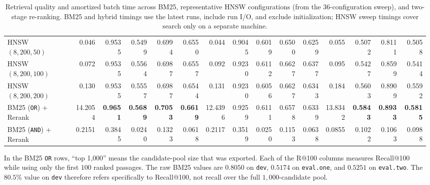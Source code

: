 \documentclass[11pt]{article}
\begin{document}
\begin{table}[H]
{\begin{tabular}{l|rrrrr|rrrrr|rrrr}
HNSW $(8, 200, 50)$  & 0.046 & 0.9535 & 0.5499 & 0.6994 & 0.6550 & 0.044 & 0.9045 & 0.6019 & 0.6500 & 0.6259 & 0.055 & 0.5072 & 0.8111 & 0.5058 \\
HNSW $(8, 200, 100)$ & 0.072 & 0.9535 & 0.5564 & 0.6987 & 0.6557 & 0.092 & 0.9230 & 0.6112 & 0.6627 & 0.6377 & 0.095 & 0.5427 & 0.8599 & 0.5414 \\
HNSW $(8, 200, 200)$ & 0.130 & 0.9535 & 0.5557 & 0.6987 & 0.6544 & 0.131 & 0.9230 & 0.6056 & 0.6627 & 0.6343 & 0.184 & 0.5603 & 0.8909 & 0.5592 \\
\midrule
BM25 (\texttt{OR}) + Rerank  & 14.2054 & \textbf{0.9651} & \textbf{0.5689} & \textbf{0.7053} & \textbf{0.6619} & 12.4396 & 0.9259 & 0.6111 & 0.6578 & 0.6339 & 13.8342 & \textbf{0.5843} & \textbf{0.8933} & \textbf{0.5815} \\
BM25 (\texttt{AND}) + Rerank & 0.2151 & 0.3845 & 0.0240 & 0.1323 & 0.0618 & 0.2117 & 0.3519 & 0.0250 & 0.1153 & 0.0638 & 0.0855 & 0.1022 & 0.1063 & 0.0988 \\
\bottomrule
\end{tabular}%
}
\caption{Retrieval quality and amortized batch time across BM25, representative HNSW configurations (from the 36-configuration sweep), and two-stage re-ranking. BM25 and hybrid timings use the latest runs, include run I/O, and exclude initialization; HNSW sweep timings cover search only on a separate machine.}
\label{tab:hnsw_sweep}
\end{table}

In the BM25 \texttt{OR} rows, ``top 1,000'' means the candidate-pool size that was exported. Each of the R@100 columns measures Recall@100 while using only the first $100$ ranked passages. The raw BM25 values are $0.8050$ on \texttt{dev}, $0.5174$ on \texttt{eval.one}, and $0.5251$ on \texttt{eval.two}. The $80.5\%$ value on \texttt{dev} therefore refers specifically to Recall@100, not recall over the full $1{,}000$-candidate pool.
\end{document}
